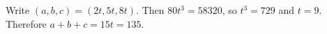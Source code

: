 Write $(a,b,c)=(2t,5t,8t)$. Then $80t^3=58320$, so $t^3=729$ and $t=9$. Therefore $a+b+c=15t=\boxed{135}$.
